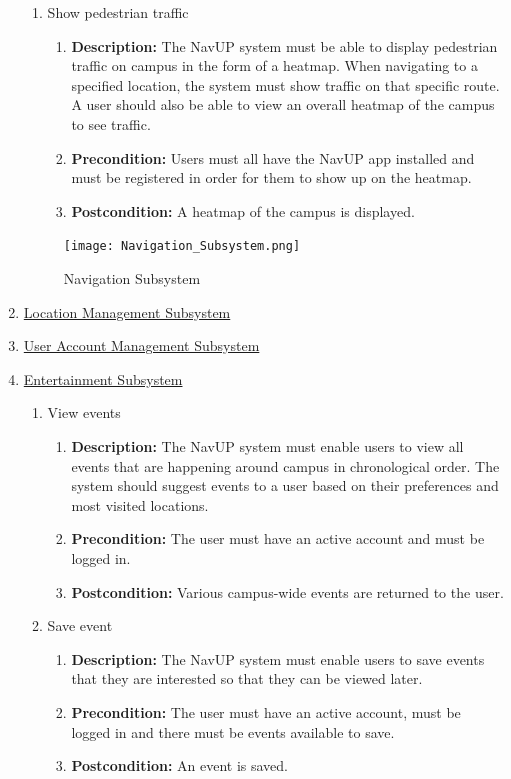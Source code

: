 \documentclass{article}
\begin{document}
\begin{enumerate}
\begin{enumerate}
		\item Show pedestrian traffic
		\begin{enumerate}
			\item \textbf{Description:} The NavUP system must be able to display pedestrian traffic on campus in the form of a heatmap. When navigating to a specified location, the system must show traffic on that specific route. A user should also be able to view an overall heatmap of the campus to see traffic.
			\item \textbf{Precondition:} Users must all have the NavUP app installed and must be registered in order for them to show up on the heatmap.
			\item \textbf{Postcondition:} A heatmap of the campus is displayed. 
		\end{enumerate}
	\end{enumerate}
	\begin{figure}[h!]
		\texttt{[image: Navigation\_Subsystem.png]}
		\caption{Navigation Subsystem}	
	\end{figure}
	
	
	\item \underline{Location Management Subsystem}
	\item \underline{User Account Management Subsystem}
	
	
	\item \underline{Entertainment Subsystem}
			\begin{enumerate}
		\item View events
		\begin{enumerate}
			\item \textbf{Description:} The NavUP system must enable users to view all events that are happening around campus in chronological order. The system should suggest events to a user based on their preferences and most visited locations.
			\item \textbf{Precondition:} The user must have an active account and must be logged in.
			\item \textbf{Postcondition:} Various campus-wide events are returned to the user.\newline
		\end{enumerate}
		
		\item Save event
		\begin{enumerate}
			\item \textbf{Description:} The NavUP system must enable users to save events that they are interested so that they can be viewed later.
			\item \textbf{Precondition:} The user must have an active account, must be logged in and there must be events available to save.
			\item \textbf{Postcondition:} An event is saved.\newline
		\end{enumerate}
		

\end{enumerate}
\end{enumerate}
\end{document}

